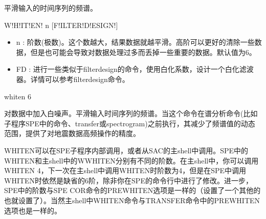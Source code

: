 \label{cmd:whiten}

平滑输入的时间序列的频谱。

\begin{SACSTX}
W!H!IT!EN! n [F!ILTER!D!ESIGN!]
\end{SACSTX}

\begin{itemize}
\item n :  阶数(极数)。这个数越大，结果数据就越平滑。高阶可以更好的清除一些数据，但是也可能会导致对数据处理过多而丢掉一些重要的数据。默认值为6。 
\item FD : 进行一些类似于filterdesign的命令，使用白化系数，设计一个白化滤波器。详情可以参考filterdesign命令。
\end{itemize}

\begin{SACDFT}
whiten 6
\end{SACDFT}


对数据中加入白噪声。平滑输入时间序列的频谱。当这个命令在谱分析命令(比如子程序SPE中的命令、transfer或spectrogram)之前执行，其减少了频谱值的动态范围，提供了对地震数据高频操作的精度。

WHITEN可以在SPE子程序内部调用，或者从SAC的主shell中调用。SPE中的WHITEN和主shell中的WWHITEN分别有不同的阶数。在主shell中，你可以调用WHITEN 4，下一次在主shell中调用WHITEN时阶数为4，但是在SPE中调用WHITEN时依然是缺省的6阶，除非你在SPE的命令行中进行了修改。进一步，SPE中的阶数与SPE COR命令的PREWHITEN选项是一样的（设置了一个其他的也就设置了）。当然主shell中WHITEN命令与TRANSFER命令中的PREWHITEN选项也是一样的。

